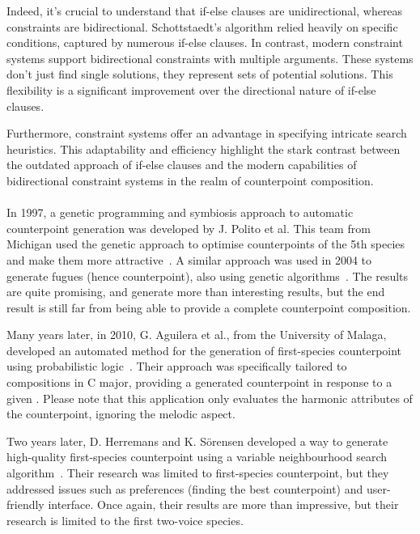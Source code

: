 Indeed, it's crucial to understand that if-else clauses are unidirectional, whereas constraints are bidirectional. Schottstaedt's algorithm relied heavily on specific conditions, captured by numerous if-else clauses. In contrast, modern constraint systems support bidirectional constraints with multiple arguments. These systems don't just find single solutions, they represent sets of potential solutions. This flexibility is a significant improvement over the directional nature of if-else clauses.

Furthermore, constraint systems offer an advantage in specifying intricate search heuristics. This adaptability and efficiency highlight the stark contrast between the outdated approach of if-else clauses and the modern capabilities of bidirectional constraint systems in the realm of counterpoint composition.

\paragraph{}
In 1997, a genetic programming and symbiosis approach to automatic counterpoint generation was developed by J. Polito et al. This team from Michigan used the genetic approach to optimise counterpoints of the 5th species and make them more attractive~\cite{polito1997musica}. A similar approach was used in 2004 to generate fugues (hence counterpoint), also using genetic algorithms~\cite{garay2004fugue}. The results are quite promising, and generate more than interesting results, but the end result is still far from being able to provide a complete counterpoint composition.

Many years later, in 2010, G. Aguilera et al., from the University of Malaga, developed an automated method for the generation of first-species counterpoint using probabilistic logic~\cite{Aguilera2010}. Their approach was specifically tailored to compositions in C major, providing a generated counterpoint in response to a given \cf. Please note that this application only evaluates the harmonic attributes of the counterpoint, ignoring the melodic aspect.

Two years later, D. Herremans and K. Sörensen developed a way to generate high-quality first-species counterpoint using a variable neighbourhood search algorithm~\cite{Herremans2012}. Their research was limited to first-species counterpoint, but they addressed issues such as preferences (finding the best counterpoint) and user-friendly interface. Once again, their results are more than impressive, but their research is limited to the first two-voice species.

